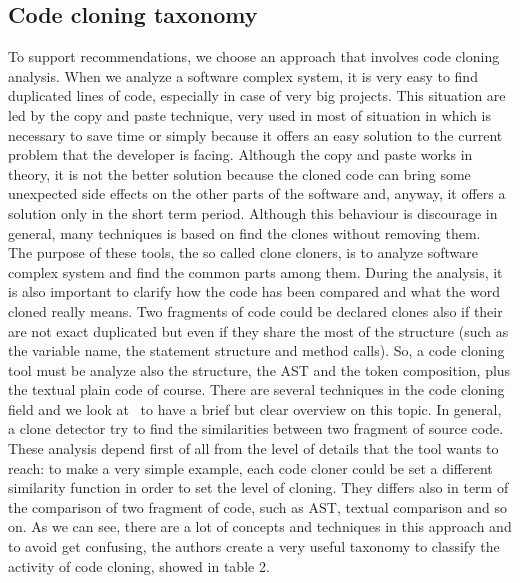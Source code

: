 \subsection{Code cloning taxonomy}
To support recommendations, we choose an approach that involves code cloning analysis. When we analyze a software complex system, it is very easy to find duplicated lines of code, especially in case of very big projects. This situation are led by the copy and paste technique, very used in most of situation in which is necessary to save time or simply because it offers an easy solution to the current problem that the developer is facing. Although the copy and paste works in theory, it is not the better solution because the cloned code can bring some unexpected side effects on the other parts of the software and, anyway, it offers a solution only in the short term period. Although this behaviour is discourage in general, many techniques is based on find the clones without removing them. \\
The purpose of these tools, the so called clone cloners, is to analyze software complex system and find the common parts among them. During the analysis, it is also important to clarify how the code has been compared and what the word cloned really means. Two fragments of code could be declared clones also if their are not exact duplicated but even if they share the most of the structure (such as the variable name, the statement structure and method calls). So, a code cloning tool must be analyze also the structure, the AST and the token composition, plus the textual plain code of course. There are several techniques in the code cloning field and we look at~\cite{chanchal_k._roy_comparison_2009} to have a brief but clear overview on this topic. In general, a clone detector try to find the similarities between two fragment of source code. These analysis depend first of all from the level of details that the tool wants to reach: to make a very simple example, each code cloner could be set a different similarity function in order to set the level of cloning. They differs also in term of the comparison of two fragment of code, such as AST, textual comparison and so on. As we can see, there are a lot of concepts and techniques in this approach and to avoid get confusing, the authors create a very useful taxonomy to classify the activity of code cloning, showed in table 2.

